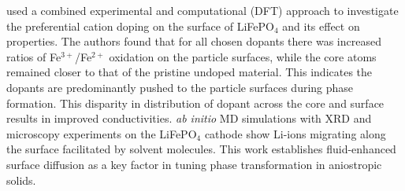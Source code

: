 \documentclass[../main.tex]{subfiles}
\begin{document}
\citeauthor{zhang2020observation} used a combined experimental and computational (DFT) approach to investigate the preferential cation doping on the surface of LiFePO$_4$ and its effect on properties. \cite{zhang2020observation} The authors found that for all chosen dopants there was increased ratios of Fe$^{3+}$/Fe$^{2+}$ oxidation on the particle surfaces, while the core atoms remained closer to that of the pristine undoped material. This indicates the dopants are predominantly pushed to the particle surfaces during phase formation. This disparity in distribution of dopant across the core and surface results in improved conductivities. \cite{zhang2020observation} \textit{ab initio} MD simulations with XRD and microscopy experiments on the LiFePO$_4$ cathode show Li-ions migrating along the surface facilitated by solvent molecules. \cite{li2018fluid} This work establishes fluid-enhanced surface diffusion as a key factor in tuning phase transformation in aniostropic solids.
\end{document}
